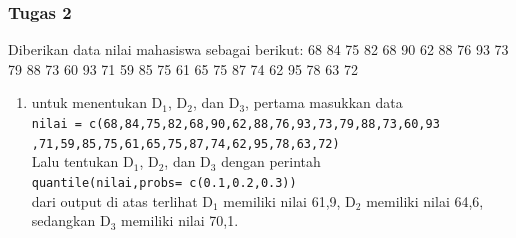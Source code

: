 \documentclass[a4paper,12pt]{article}
\begin{document}
\newpage

\subsubsection{Tugas 2}
Diberikan data nilai mahasiswa sebagai berikut: 68 84 75 82 68 90 62 88 76 93 73 79 88 73 60 93 71 59 85 75 61 65 75 87 74 62 95 78 63 72

\begin{enumerate}[label=\alph*.]
	\item 
	\begin{minipage}[t]{\linewidth}
		\raggedright
	\end{minipage}
	untuk menentukan D$_{1}$, D$_{2}$, dan D$_{3}$, pertama masukkan data\\
	\texttt{nilai = c(68,84,75,82,68,90,62,88,76,93,73,79,88,73,60,93\\
		,71,59,85,75,61,65,75,87,74,62,95,78,63,72)}\\
	Lalu tentukan D$_{1}$, D$_{2}$, dan D$_{3}$ dengan perintah\\
	\texttt{quantile(nilai,probs= c(0.1,0.2,0.3))\\}
	dari output di atas terlihat D$_{1}$ memiliki nilai 61,9, D$_{2}$ memiliki nilai 64,6, sedangkan D$_{3}$ memiliki nilai 70,1.
	

\end{enumerate}
\end{document}
